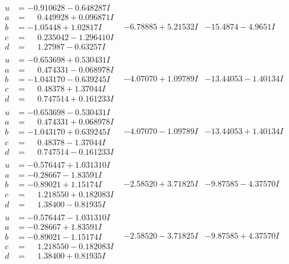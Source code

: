 \documentclass[1p]{elsarticle_modified}
\theoremstyle{definition}
\begin{document}
$$\begin{array}{c|c|c}
\begin{aligned}
u &= -0.910628 - 0.648287 I \\
a &= \phantom{-}0.449928 + 0.096871 I \\
b &= -1.05448 + 1.02817 I \\
c &= \phantom{-}0.235042 - 1.296410 I \\
d &= \phantom{-}1.27987 - 0.63257 I\end{aligned}
 & -6.78885 + 5.21532 I & -15.4874 - 4.9651 I \\ \hline\begin{aligned}
u &= -0.653698 + 0.530431 I \\
a &= \phantom{-}0.474331 - 0.068978 I \\
b &= -1.043170 - 0.639245 I \\
c &= \phantom{-}0.48378 + 1.37044 I \\
d &= \phantom{-}0.747514 + 0.161233 I\end{aligned}
 & -4.07070 + 1.09789 I & -13.44053 - 1.40134 I \\ \hline\begin{aligned}
u &= -0.653698 - 0.530431 I \\
a &= \phantom{-}0.474331 + 0.068978 I \\
b &= -1.043170 + 0.639245 I \\
c &= \phantom{-}0.48378 - 1.37044 I \\
d &= \phantom{-}0.747514 - 0.161233 I\end{aligned}
 & -4.07070 - 1.09789 I & -13.44053 + 1.40134 I \\ \hline\begin{aligned}
u &= -0.576447 + 1.031310 I \\
a &= -0.28667 - 1.83591 I \\
b &= -0.89021 + 1.15174 I \\
c &= \phantom{-}1.218550 + 0.182083 I \\
d &= \phantom{-}1.38400 - 0.81935 I\end{aligned}
 & -2.58520 + 3.71825 I & -9.87585 - 4.37570 I \\ \hline\begin{aligned}
u &= -0.576447 - 1.031310 I \\
a &= -0.28667 + 1.83591 I \\
b &= -0.89021 - 1.15174 I \\
c &= \phantom{-}1.218550 - 0.182083 I \\
d &= \phantom{-}1.38400 + 0.81935 I\end{aligned}
 & -2.58520 - 3.71825 I & -9.87585 + 4.37570 I\\

\end{array}$$
\end{document}
